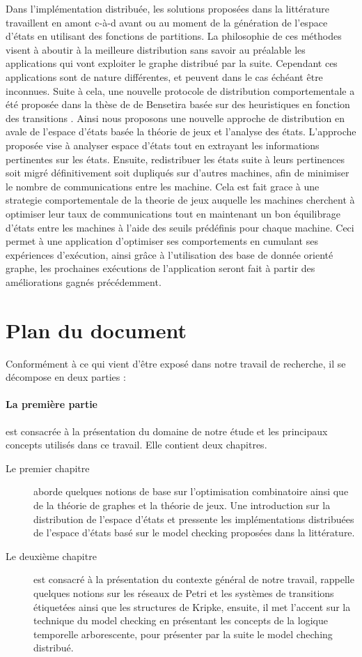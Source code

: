 Dans l’implémentation distribuée, les solutions proposées dans la littérature travaillent en amont c-à-d avant ou au moment de la génération de l’espace d’états en utilisant des fonctions de partitions. La philosophie de ces méthodes visent à aboutir à la meilleure distribution sans savoir au préalable les applications qui vont exploiter le graphe distribué par la suite. Cependant ces applications sont de nature différentes, et peuvent dans le cas échéant être inconnues. Suite à cela, une nouvelle protocole de distribution comportementale a été proposée dans la thèse de de Bensetira basée sur des heuristiques en fonction des transitions \citep{BENSETIRA2017}. Ainsi nous proposons une nouvelle approche de distribution en avale de l'espace d'états basée la théorie de jeux et l'analyse des états. L’approche proposée vise à analyser espace d’états tout en extrayant les informations pertinentes sur les états. Ensuite, redistribuer les états suite à leurs pertinences soit migré définitivement soit dupliqués sur d’autres machines, afin de minimiser le nombre de communications entre les machine. Cela est fait grace à une strategie comportementale de la theorie de jeux auquelle les machines cherchent à optimiser leur taux de communications tout en maintenant un bon équilibrage d'états entre les machines à l’aide des seuils prédéfinis pour chaque machine. Ceci permet à une application d'optimiser ses comportements en cumulant ses expériences d’exécution, ainsi grâce à l'utilisation des base de donnée orienté graphe, les prochaines exécutions  de l’application seront fait à partir des améliorations gagnés précédemment.

\section*{Plan du document}
Conformément à ce qui vient d’être exposé dans notre travail de recherche, il se décompose en deux parties :

\paragraph{La première partie} est consacrée à la présentation du domaine de notre étude et les
principaux concepts utilisés dans ce travail. Elle contient deux chapitres.
\begin{description}
	\item[Le premier chapitre] aborde quelques notions de base sur l’optimisation combinatoire ainsi que de la théorie de graphes et la théorie de jeux. Une introduction sur la distribution de l'espace d'états et pressente les implémentations distribuées de l'espace d'états basé sur le model checking proposées dans la littérature.
	\item [Le deuxième chapitre ] est consacré à la présentation du contexte général de notre travail, rappelle quelques notions sur les réseaux de Petri et les systèmes de transitions étiquetées ainsi que les structures de Kripke, ensuite, il met l’accent sur	la technique du model checking en présentant les concepts de la logique temporelle arborescente, pour présenter par la suite le model cheching distribué.
\end{description}

